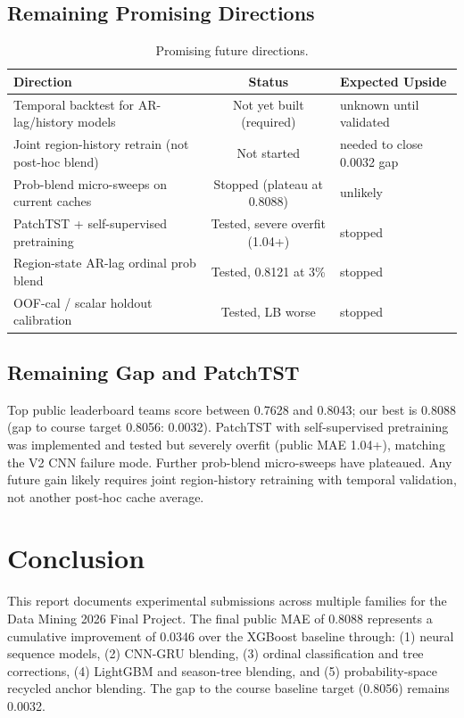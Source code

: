\documentclass[12pt, a4paper]{article}
\begin{document}
\subsection{Remaining Promising Directions}

\begin{table}[H]
\centering
\caption{Promising future directions.}
\label{tab:future}
\begin{tabular}{@{}lcl@{}}
\toprule
\textbf{Direction} & \textbf{Status} & \textbf{Expected Upside} \\
\midrule
Temporal backtest for AR-lag/history models & Not yet built (required)        & unknown until validated \\
Joint region-history retrain (not post-hoc blend) & Not started                 & needed to close 0.0032 gap \\
Prob-blend micro-sweeps on current caches & Stopped (plateau at 0.8088)     & unlikely \\
PatchTST + self-supervised pretraining  & Tested, severe overfit (1.04+)   & stopped \\
Region-state AR-lag ordinal prob blend  & Tested, 0.8121 at 3\%            & stopped \\
OOF-cal / scalar holdout calibration    & Tested, LB worse                 & stopped \\
\bottomrule
\end{tabular}
\end{table}

\subsection{Remaining Gap and PatchTST}

Top public leaderboard teams score between 0.7628 and 0.8043; our best is 0.8088 (gap to course target 0.8056: 0.0032). PatchTST with self-supervised pretraining was implemented and tested but severely overfit (public MAE 1.04+), matching the V2 CNN failure mode. Further prob-blend micro-sweeps have plateaued. Any future gain likely requires joint region-history retraining with temporal validation, not another post-hoc cache average.

\section{Conclusion}
This report documents experimental submissions across multiple families for the Data Mining 2026 Final Project. The final public MAE of 0.8088 represents a cumulative improvement of 0.0346 over the XGBoost baseline through: (1) neural sequence models, (2) CNN-GRU blending, (3) ordinal classification and tree corrections, (4) LightGBM and season-tree blending, and (5) probability-space recycled anchor blending. The gap to the course baseline target (0.8056) remains 0.0032.
\end{document}
